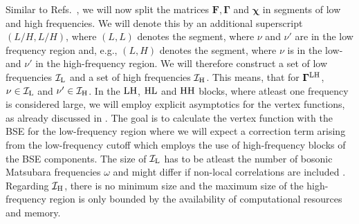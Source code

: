 \documentclass[../../main.tex]{subfiles}
\begin{document}
Similar to Refs.~\cite{Kunes2011, Hummel2014, Tagliavini2018}, we will now split the matrices $\bm{F}, \bm{\Gamma}$ and $\bm{\chi}$ in segments of low and high frequencies. We will denote this by an additional superscript $(L/H, L/H)$, where $(L,L)$ denotes the segment, where $\nu$ and $\nu'$ are in the low frequency region and, e.g., $(L,H)$ denotes the segment, where $\nu$ is in the low- and $\nu'$ in the high-frequency region. We will therefore construct a set of low frequencies $\mathcal{I}_{\text{L}}$ and a set of high frequencies $\mathcal{I}_{\text{H}}$. This means, that for $\bm\Gamma^{\text{L}\text{H}}$, $\nu\in\mathcal{I}_{\text{L}}$ and $\nu'\in\mathcal{I}_{\text{H}}$. In the $\text{L}\text{H}$, $\text{H}\text{L}$ and $\text{H}\text{H}$ blocks, where atleast one frequency is considered large, we will employ explicit asymptotics for the vertex functions, as already discussed in . The goal is to calculate the vertex function with the BSE for the low-frequency region where we will expect a correction term arising from the low-frequency cutoff which employs the use of high-frequency blocks of the BSE components. The size of $\mathcal{I}_{\text{L}}$ has to be atleast the number of bosonic Matsubara frequencies $\omega$ \cite{Tagliavini2018} and might differ if non-local correlations are included \cite{Kinza2013}. Regarding $\mathcal{I}_{\text{H}}$, there is no minimum size and the maximum size of the high-frequency region is only bounded by the availability of computational resources and memory. 
\end{document}
